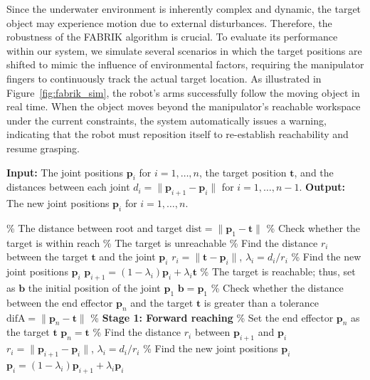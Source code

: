 \documentclass[a4paper,11pt]{article}
\begin{document}
Since the underwater environment is inherently complex and dynamic, the target object may experience motion due to external disturbances. Therefore, the robustness of the \gls{FABRIK} algorithm is crucial. To evaluate its performance within our system, we simulate several scenarios in which the target positions are shifted to mimic the influence of environmental factors, requiring the manipulator fingers to continuously track the actual target location. As illustrated in Figure~\ref{fig:fabrik_sim}, the robot’s arms successfully follow the moving object in real time. When the object moves beyond the manipulator’s reachable workspace under the current constraints, the system automatically issues a warning, indicating that the robot must reposition itself to re-establish reachability and resume grasping.

\begin{algorithm} 
\caption{A full iteration of the \gls{FABRIK} algorithm \cite{Aristidou:2011:FABRIK}}
\label{alg:fabrik}
\begin{algorithmic}[1] 
\State \textbf{Input:} The joint positions $\mathbf{p}_i$ for $i = 1,\ldots,n$, 
the target position $\mathbf{t}$, and the distances between each joint 
$d_i = \lVert \mathbf{p}_{i+1} - \mathbf{p}_i \rVert$ for $i = 1,\ldots,n-1$.
\State \textbf{Output:} The new joint positions $\mathbf{p}_i$ for $i = 1,\ldots,n$.

\Statex
\State \% The distance between root and target
\State $\text{dist} = \lVert \mathbf{p}_1 - \mathbf{t} \rVert$
\State \% Check whether the target is within reach
    \State \% The target is unreachable
        \State \% Find the distance $r_i$ between the target $\mathbf{t}$ and the joint $\mathbf{p}_i$
        \State $r_i = \lVert \mathbf{t} - \mathbf{p}_i \rVert$, $\lambda_i = d_i / r_i$
        \State \% Find the new joint positions $\mathbf{p}_i$
        \State $\mathbf{p}_{i+1} = (1 - \lambda_i)\mathbf{p}_i + \lambda_i \mathbf{t}$
    \EndFor
\Else
    \State \% The target is reachable; thus, set as $\mathbf{b}$ the initial position of the joint $\mathbf{p}_1$
    \State $\mathbf{b} = \mathbf{p}_1$
    \State \% Check whether the distance between the end effector $\mathbf{p}_n$ and the target $\mathbf{t}$ is greater than a tolerance
    \State $\text{difA} = \lVert \mathbf{p}_n - \mathbf{t} \rVert$
        \State \% \textbf{Stage 1: Forward reaching}
        \State \% Set the end effector $\mathbf{p}_n$ as the target $\mathbf{t}$
        \State $\mathbf{p}_n = \mathbf{t}$
            \State \% Find the distance $r_i$ between $\mathbf{p}_{i+1}$ and $\mathbf{p}_i$
            \State $r_i = \lVert \mathbf{p}_{i+1} - \mathbf{p}_i \rVert$, $\lambda_i = d_i / r_i$
            \State \% Find the new joint positions $\mathbf{p}_i$
            \State $\mathbf{p}_i = (1 - \lambda_i)\mathbf{p}_{i+1} + \lambda_i \mathbf{p}_i$
        \EndFor


\end{algorithmic}
\end{algorithm}
\end{document}
